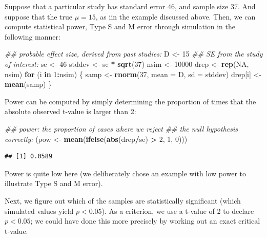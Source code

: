 \documentclass[12pt,]{krantz}
\newenvironment{Shaded}{\begin{snugshade}}{\end{snugshade}}
\newcommand{\CommentTok}[1]{\textcolor[rgb]{0.56,0.35,0.01}{\textit{#1}}}
\newcommand{\ControlFlowTok}[1]{\textcolor[rgb]{0.13,0.29,0.53}{\textbf{#1}}}
\newcommand{\DataTypeTok}[1]{\textcolor[rgb]{0.13,0.29,0.53}{#1}}
\newcommand{\DecValTok}[1]{\textcolor[rgb]{0.00,0.00,0.81}{#1}}
\newcommand{\KeywordTok}[1]{\textcolor[rgb]{0.13,0.29,0.53}{\textbf{#1}}}
\newcommand{\NormalTok}[1]{#1}
\newcommand{\OperatorTok}[1]{\textcolor[rgb]{0.81,0.36,0.00}{\textbf{#1}}}
\newcommand{\OtherTok}[1]{\textcolor[rgb]{0.56,0.35,0.01}{#1}}
\newcommand{\StringTok}[1]{\textcolor[rgb]{0.31,0.60,0.02}{#1}}
\begin{document}
Suppose that a particular study has standard error \(46\), and sample size \(37\). And suppose that the true \(\mu=15\), as iin the example discussed above. Then, we can compute statistical power, Type S and M error through simulation in the following manner:

\begin{Shaded}
\begin{Highlighting}[]
\CommentTok{## probable effect size, derived from past studies:}
\NormalTok{D <-}\StringTok{ }\DecValTok{15}
\CommentTok{## SE from the study of interest:}
\NormalTok{se <-}\StringTok{ }\DecValTok{46}
\NormalTok{stddev <-}\StringTok{ }\NormalTok{se }\OperatorTok{*}\StringTok{ }\KeywordTok{sqrt}\NormalTok{(}\DecValTok{37}\NormalTok{)}
\NormalTok{nsim <-}\StringTok{ }\DecValTok{10000}
\NormalTok{drep <-}\StringTok{ }\KeywordTok{rep}\NormalTok{(}\OtherTok{NA}\NormalTok{, nsim)}
\ControlFlowTok{for}\NormalTok{ (i }\ControlFlowTok{in} \DecValTok{1}\OperatorTok{:}\NormalTok{nsim) \{}
\NormalTok{  samp <-}\StringTok{ }\KeywordTok{rnorm}\NormalTok{(}\DecValTok{37}\NormalTok{, }\DataTypeTok{mean =}\NormalTok{ D, }\DataTypeTok{sd =}\NormalTok{ stddev)}
\NormalTok{  drep[i] <-}\StringTok{ }\KeywordTok{mean}\NormalTok{(samp)}
\NormalTok{\}}
\end{Highlighting}
\end{Shaded}

Power can be computed by simply determining the proportion of times that the absolute observed t-value is larger than 2:

\begin{Shaded}
\begin{Highlighting}[]
\CommentTok{## power: the proportion of cases where we reject}
\CommentTok{## the null hypothesis correctly:}
\NormalTok{(pow <-}\StringTok{ }\KeywordTok{mean}\NormalTok{(}\KeywordTok{ifelse}\NormalTok{(}\KeywordTok{abs}\NormalTok{(drep}\OperatorTok{/}\NormalTok{se) }\OperatorTok{>}\StringTok{ }\DecValTok{2}\NormalTok{, }\DecValTok{1}\NormalTok{, }\DecValTok{0}\NormalTok{)))}
\end{Highlighting}
\end{Shaded}

\begin{verbatim}
## [1] 0.0589
\end{verbatim}

Power is quite low here (we deliberately chose an example with low power to illustrate Type S and M error).

Next, we figure out which of the samples are statistically significant (which simulated values yield \(p<0.05\)). As a criterion, we use a t-value of 2 to declare \(p<0.05\); we could have done this more precisely by working out an exact critical t-value.
\end{document}
